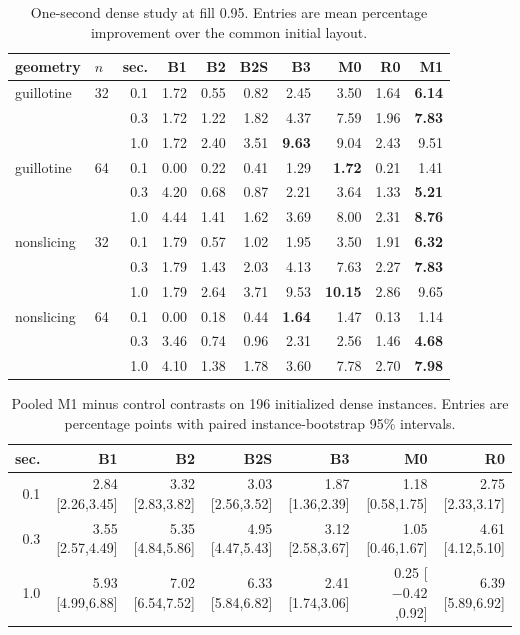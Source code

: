 \documentclass[11pt]{article}
\begin{document}
\begin{table}[htbp]
\centering
\caption{One-second dense study at fill 0.95. Entries are mean percentage
improvement over the common initial layout.}
\label{tab:sharedfull}
\small
\setlength{\tabcolsep}{4pt}
\begin{tabular}{@{}llrrrrrrrr@{}}
\toprule
geometry & $n$ & sec. & B1 & B2 & B2S & B3 & M0 & R0 & M1 \\
\midrule
guillotine & 32 & 0.1 & 1.72 & 0.55 & 0.82 & 2.45 & 3.50 & 1.64 & \textbf{6.14} \\
            &    & 0.3 & 1.72 & 1.22 & 1.82 & 4.37 & 7.59 & 1.96 & \textbf{7.83} \\
            &    & 1.0 & 1.72 & 2.40 & 3.51 & \textbf{9.63} & 9.04 & 2.43 & 9.51 \\
guillotine & 64 & 0.1 & 0.00 & 0.22 & 0.41 & 1.29 & \textbf{1.72} & 0.21 & 1.41 \\
            &    & 0.3 & 4.20 & 0.68 & 0.87 & 2.21 & 3.64 & 1.33 & \textbf{5.21} \\
            &    & 1.0 & 4.44 & 1.41 & 1.62 & 3.69 & 8.00 & 2.31 & \textbf{8.76} \\
nonslicing & 32 & 0.1 & 1.79 & 0.57 & 1.02 & 1.95 & 3.50 & 1.91 & \textbf{6.32} \\
            &    & 0.3 & 1.79 & 1.43 & 2.03 & 4.13 & 7.63 & 2.27 & \textbf{7.83} \\
            &    & 1.0 & 1.79 & 2.64 & 3.71 & 9.53 & \textbf{10.15} & 2.86 & 9.65 \\
nonslicing & 64 & 0.1 & 0.00 & 0.18 & 0.44 & \textbf{1.64} & 1.47 & 0.13 & 1.14 \\
            &    & 0.3 & 3.46 & 0.74 & 0.96 & 2.31 & 2.56 & 1.46 & \textbf{4.68} \\
            &    & 1.0 & 4.10 & 1.38 & 1.78 & 3.60 & 7.78 & 2.70 & \textbf{7.98} \\
\bottomrule
\end{tabular}
\end{table}

\begin{table}[htbp]
\centering
\caption{Pooled M1 minus control contrasts on 196 initialized dense instances.
Entries are percentage points with paired instance-bootstrap 95\% intervals.}
\label{tab:sharedcontrasts}
\scriptsize
\setlength{\tabcolsep}{2.4pt}
\begin{tabular}{@{}rrrrrrr@{}}
\toprule
sec. & B1 & B2 & B2S & B3 & M0 & R0 \\
\midrule
0.1 & 2.84 [2.26,3.45] & 3.32 [2.83,3.82] & 3.03 [2.56,3.52] & 1.87 [1.36,2.39] & 1.18 [0.58,1.75] & 2.75 [2.33,3.17] \\
0.3 & 3.55 [2.57,4.49] & 5.35 [4.84,5.86] & 4.95 [4.47,5.43] & 3.12 [2.58,3.67] & 1.05 [0.46,1.67] & 4.61 [4.12,5.10] \\
1.0 & 5.93 [4.99,6.88] & 7.02 [6.54,7.52] & 6.33 [5.84,6.82] & 2.41 [1.74,3.06] & 0.25 [$-0.42$,0.92] & 6.39 [5.89,6.92] \\
\bottomrule
\end{tabular}
\end{table}
\end{document}
